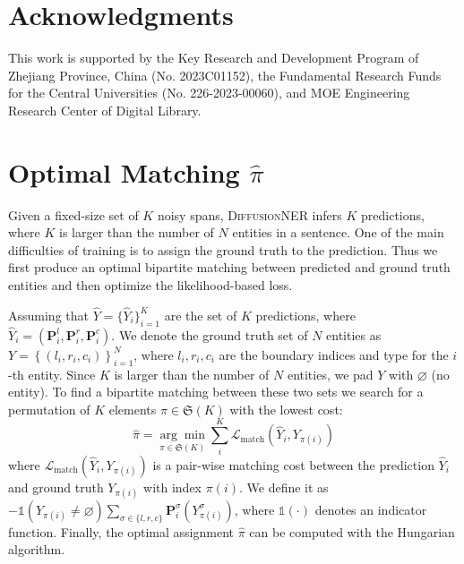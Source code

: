 \documentclass[11pt]{article}
\begin{document}
\section*{Acknowledgments}
This work is supported by the Key Research and Development Program of Zhejiang Province, China (No. 2023C01152),  the Fundamental Research Funds for the Central Universities (No. 226-2023-00060), and MOE Engineering Research Center of Digital Library.




\clearpage
\appendix


\section{Optimal Matching $\hat{\pi}$}
\label{app:pi}

Given a fixed-size set of $K$ noisy spans, \textsc{DiffusionNER} infers $K$ predictions, where $K$ is larger than the number of $N$
entities in a sentence. One of the main difficulties of training is to assign the ground truth to the prediction. Thus we first produce an optimal bipartite matching between predicted and ground truth entities and then optimize the likelihood-based loss.

Assuming that $\hat{Y} = \{\hat{Y}_i\}^K_{i=1}$ are the set of $K$ predictions, where $\hat{Y}_i=\left(\mathbf{P}_i^l, \mathbf{P}_i^r, \mathbf{P}_i^c\right)$. We denote the ground truth set of $N$ entities as $Y=\left\{\left(l_i, r_i, c_i\right)\right\}_{i=1}^N$, where $l_i, r_i, c_i$ are the boundary indices and type for the $i$-th entity. Since $K$ is larger than the number of $N$ entities, we pad $Y$ with $\varnothing$ (no entity). To find
a bipartite matching between these two sets we search for a permutation of $K$ elements $\pi \in \mathfrak{S}(K)$ with the lowest cost:
\begin{equation*}
\hat{\pi}=\underset{\pi \in \mathfrak{S}(K)}{\arg \min } \sum_i^K \mathcal{L}_{\operatorname{match}}\left(\hat{Y}_i, {Y}_{\pi(i)}\right)
\end{equation*}
\noindent where $\mathcal{L}_{\operatorname{match}}\left(\hat{Y}_i, {Y}_{\pi(i)}\right)$ is a pair-wise matching cost between the prediction $\hat{Y}_i$ and ground truth ${Y}_{\pi(i)}$ with index $\pi(i)$. We define it as
$-\mathds{1}({Y}_{\pi(i)} \neq \varnothing)\sum_{\sigma\in \{l,r,c\}} \mathbf{P}_{i}^\sigma\left(Y^\sigma_{\pi(i)}\right)$,
\noindent where $\mathds{1}(\cdot)$ denotes an indicator function. Finally, the optimal assignment $\hat{\pi}$ can be computed with the Hungarian algorithm.
\end{document}
